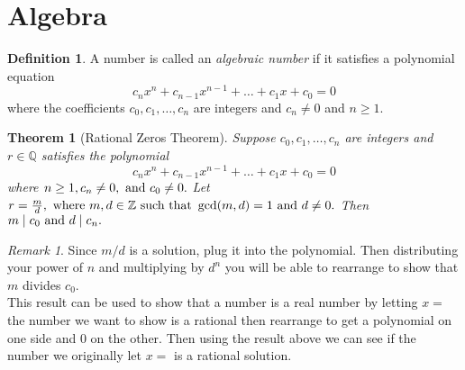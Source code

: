 \documentclass{article}
\newtheorem{theorem}{Theorem}[section]
\theoremstyle{definition}
\newtheorem{definition}{Definition}[section]
\theoremstyle{remark}
\newtheorem{remark}{Remark}[section]
\begin{document}


\section{Algebra}












\begin{definition}\label{def:algebraic number}
A number is called an \textit{algebraic number} if it satisfies a polynomial equation
\[
c_nx^n + c_{n-1}x^{n-1} + \dotsc + c_1x + c_0 = 0
\]
where the coefficients \(c_0, c_1, \dots, c_n\) are integers and \(c_n \neq 0\) and \(n \geq 1.\)
\end{definition}






















\begin{theorem}[Rational Zeros Theorem]\label{thm:rational zeros theorem}
Suppose \(c_0, c_1, \dots , c_n \) are integers and \( r \in \mathbb{Q}\) satisfies the polynomial
\[
c_nx^n + c_{n-1}x^{n-1} + \dotsc + c_1x + c_0 = 0
\]
where \(n \geq 1, c_n \neq 0, \textnormal{ and } c_0 \neq 0.\) Let \(r = \frac{m}{d}, \textnormal{ where } m, d \in \mathbb{Z} \textnormal{ such that } \gcd(m,d) = 1 \textnormal{ and } d \neq 0.\) Then \(m\mid c_0 \textnormal{ and } d \mid c_n.\) 
\end{theorem}

\begin{remark}
Since $m/d$ is a solution, plug it into the polynomial. Then distributing your
power of $n$ and multiplying by $d^n$ you will be able to rearrange to show 
that $m$ divides $c_0$.\\
This result can be used to show that a number is a real number by letting
$x=$ the number we want to show is a rational then rearrange to get a polynomial on one 
side and 0 on the other. Then using the result above we can see if the number we originally let $x=$
is a rational solution.
\end{remark}
\end{document}
